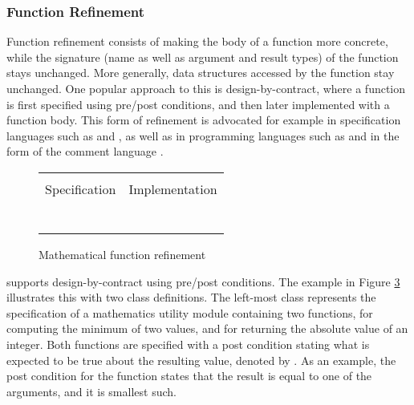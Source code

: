 \subsubsection{Function Refinement}

Function refinement consists of making the body of a function more concrete,
while the signature (name as well as  argument and result types) of the 
function stays unchanged. More generally, data 
structures accessed by the function stay unchanged. One popular approach to this
is design-by-contract, where a function is first specified using pre/post 
conditions, and then later implemented with a function body. This form of 
refinement is advocated for example in specification languages such as 
\vdm{} \cite{vdm78,bjoerner-jones-82,jones90} and \raiselang{} \cite{raise92,george-raise-2008}, as well as in programming languages such as \eiffel{} \cite{eiffel} and \java{} in the form of the \jml{} comment language \cite{jml}. 

\begin{figure}
  \centering
  \begin{tabular}[c]{c|c}
    \hline \\
    Specification & Implementation \\
    \hline\hline \\ \\
    \begin{subfigure}[c]{0.5\textwidth}
     
      \label{fig:prepost1}
    \end{subfigure}
    &
    \begin{subfigure}[c]{0.5\textwidth}
      
      \label{fig:prepost2}
    \end{subfigure}
    \\ \\
    \hline
  \end{tabular}    
  \caption{Mathematical function refinement}
  \label{fig:prepost}
\end{figure}

\Klang{} supports design-by-contract using pre/post conditions. The example in
Figure \ref{fig:prepost} illustrates this with two class definitions. The left-most
class  represents the specification of a mathematics utility 
module containing two functions,  for computing the minimum of
two values, and  for returning the absolute value of an integer. Both 
functions are specified with a post condition stating what is expected to be true
about the resulting value, denoted by . As an example, the post
condition for the  function states that the result is equal to one of
the arguments, and it is smallest such.

